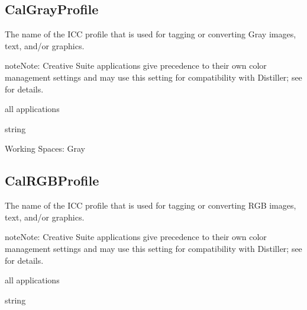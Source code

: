 \documentclass[letterpaper,12pt,english,openany,oneside]{sphinxmanual}
\begin{document}
\subsection{CalGrayProfile}
\label{\detokenize{PDF_Create_CommonSettings:calgrayprofile}}
The name of the ICC profile that is used for tagging or converting Gray images, text, and/or graphics.

\begin{sphinxadmonition}{note}{Note:}
Creative Suite applications give precedence to their own color management settings and may use this setting for compatibility with Distiller; see  for details.
\end{sphinxadmonition}
\label{\detokenize{PDF_Create_CommonSettings:supported-by-75}}

all applications

\label{\detokenize{PDF_Create_CommonSettings:type-74}}

string

\label{\detokenize{PDF_Create_CommonSettings:ui-name-61}}

Working Spaces: Gray




\subsection{CalRGBProfile}
\label{\detokenize{PDF_Create_CommonSettings:calrgbprofile}}
The name of the ICC profile that is used for tagging or converting RGB images, text, and/or graphics.

\begin{sphinxadmonition}{note}{Note:}
Creative Suite applications give precedence to their own color management settings and may use this setting for compatibility with Distiller; see  for details.
\end{sphinxadmonition}
\label{\detokenize{PDF_Create_CommonSettings:supported-by-76}}

all applications

\label{\detokenize{PDF_Create_CommonSettings:type-75}}

string

\label{\detokenize{PDF_Create_CommonSettings:ui-name-62}}
\end{document}
